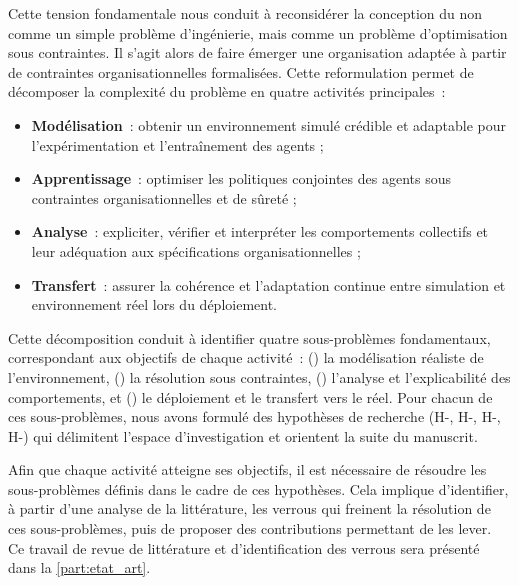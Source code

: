 Cette tension fondamentale nous conduit à reconsidérer la conception du  non comme un simple problème d’ingénierie, mais comme un problème d’optimisation sous contraintes. Il s’agit alors de faire émerger une organisation adaptée à partir de contraintes organisationnelles formalisées. Cette reformulation permet de décomposer la complexité du problème en quatre activités principales~:
\begin{itemize}
  \item \textbf{Modélisation}~: obtenir un environnement simulé crédible et adaptable pour l’expérimentation et l’entraînement des agents ;
  \item \textbf{Apprentissage}~: optimiser les politiques conjointes des agents sous contraintes organisationnelles et de sûreté ;
  \item \textbf{Analyse}~: expliciter, vérifier et interpréter les comportements collectifs et leur adéquation aux spécifications organisationnelles ;
  \item \textbf{Transfert}~: assurer la cohérence et l’adaptation continue entre simulation et environnement réel lors du déploiement.
\end{itemize}
Cette décomposition conduit à identifier quatre sous-problèmes fondamentaux, correspondant aux objectifs de chaque activité~: () la modélisation réaliste de l’environnement, () la résolution sous contraintes, () l’analyse et l’explicabilité des comportements, et () le déploiement et le transfert vers le réel. Pour chacun de ces sous-problèmes, nous avons formulé des hypothèses de recherche (H-, H-, H-, H-) qui délimitent l’espace d’investigation et orientent la suite du manuscrit.

Afin que chaque activité atteigne ses objectifs, il est nécessaire de résoudre les sous-problèmes définis dans le cadre de ces hypothèses. Cela implique d’identifier, à partir d’une analyse de la littérature, les verrous qui freinent la résolution de ces sous-problèmes, puis de proposer des contributions permettant de les lever. Ce travail de revue de littérature et d’identification des verrous sera présenté dans la \autoref{part:etat_art}.
